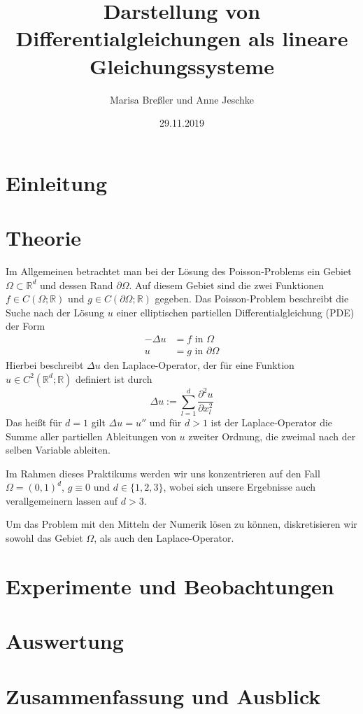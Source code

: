\documentclass{scrartcl}
\newcommand{\R}{\mathbb{R}}
\begin{document}
\title{Darstellung von Differentialgleichungen als lineare Gleichungssysteme}
\author{Marisa Breßler und Anne Jeschke}
\date{29.11.2019}
\maketitle

\tableofcontents

\pagebreak \section{Einleitung}
\label{sec:einleitung}

\pagebreak \section{Theorie}
\label{sec:theorie}
Im Allgemeinen betrachtet man bei der Lösung des Poisson-Problems ein Gebiet $\Omega\subset\R^d$ und dessen Rand $\partial\Omega$.
Auf diesem Gebiet sind die zwei Funktionen $f\in C(\Omega ; \R)$ und $g\in C(\partial\Omega ; \R)$ gegeben.
Das Poisson-Problem beschreibt die Suche nach der Lösung $u$ einer elliptischen partiellen Differentialgleichung (PDE) der Form
\[\begin{split}
-\Delta u &= f \textrm{ in } \Omega\\
        u &= g \textrm{ in } \partial\Omega
\end{split}
\]
Hierbei beschreibt $\Delta u$ den Laplace-Operator, der für eine Funktion $u\in C^2(\R^d;\R)$ definiert ist durch \[\Delta u := \sum_{l=1}^{d} \frac{\partial^2 u}{\partial x^2_l}\]
Das heißt für $d=1$ gilt $\Delta u = u''$ und für $d>1$ ist der Laplace-Operator die Summe aller partiellen Ableitungen von $u$ zweiter Ordnung, die zweimal nach der selben Variable ableiten.

Im Rahmen dieses Praktikums werden wir uns konzentrieren auf den Fall $\Omega=(0,1)^d$, $g\equiv0$ und $d\in\{1, 2, 3\}$, wobei sich unsere Ergebnisse auch verallgemeinern lassen auf $d>3$.

Um das Problem mit den Mitteln der Numerik lösen zu können, diskretisieren wir sowohl das Gebiet $\Omega$, als auch den Laplace-Operator.
\pagebreak \section{Experimente und Beobachtungen}
\label{sec:experimente}


\pagebreak \section{Auswertung}
\label{sec:auswertung}

\pagebreak \section{Zusammenfassung und Ausblick}
\label{sec:zusammenfassung}

\pagebreak


\end{document}
